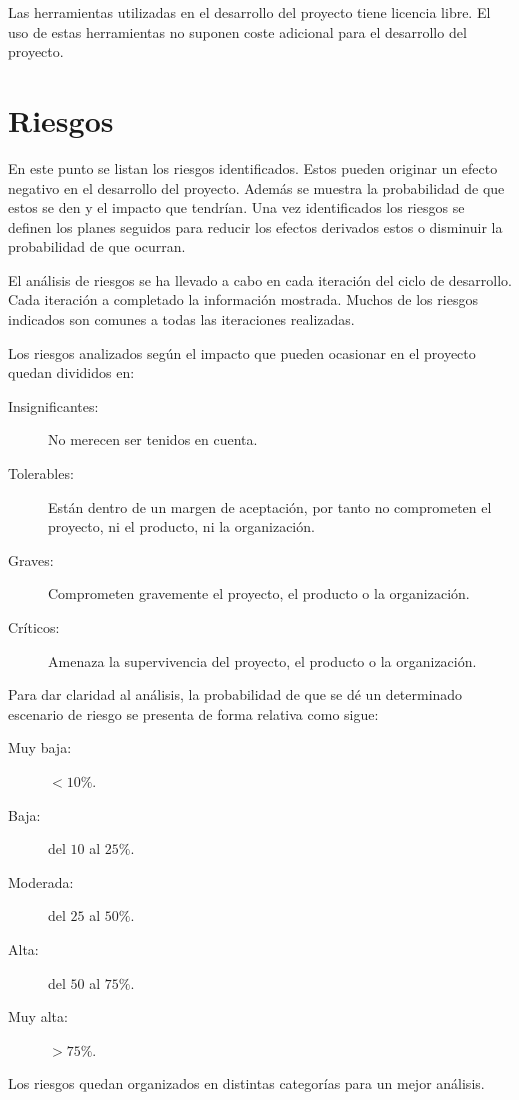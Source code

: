 Las herramientas utilizadas en el desarrollo del proyecto tiene licencia libre. El uso de estas herramientas no
suponen coste adicional para el desarrollo del proyecto. 

\section{Riesgos}

En este punto se listan los riesgos identificados. Estos pueden originar un efecto negativo en el 
desarrollo del proyecto. Además se muestra la probabilidad de que estos se den y el impacto que tendrían. 
Una vez identificados los riesgos se definen los planes seguidos para reducir los efectos derivados estos o disminuir
la probabilidad de que ocurran.

El análisis de riesgos se ha llevado a cabo en cada iteración del ciclo de desarrollo. Cada iteración a completado la 
información mostrada. Muchos de los riesgos indicados son comunes a todas las iteraciones realizadas. 

Los riesgos analizados según el impacto que pueden ocasionar en el proyecto quedan divididos en:
\begin {description}
\item[Insignificantes:] No merecen ser tenidos en cuenta.
\item[Tolerables:] Están dentro de un margen de aceptación, por tanto no comprometen el proyecto, ni el producto, ni la organización.
\item[Graves:] Comprometen gravemente el proyecto, el producto o la organización.
\item[Críticos:] Amenaza la supervivencia del proyecto, el producto o la organización.
\end{description}

Para dar claridad al análisis, la probabilidad de que se dé un determinado escenario de riesgo se presenta de forma relativa como sigue:
\begin{description}
\item[Muy baja:] $<10\%$.
\item[Baja:] del $10$ al $25\%$.
\item[Moderada:] del $25$ al $50\%$.
\item[Alta:] del $50$ al $75\%$.
\item[Muy alta:] $>75\%$.
\end{description}

Los riesgos quedan organizados en distintas categorías para un mejor análisis.

